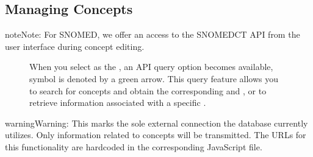\documentclass[a4paper,10pt,english]{sphinxmanual}
\begin{document}
\subsection{Managing Concepts}
\label{\detokenize{TechnicalDetails:managing-concepts}}
\begin{sphinxadmonition}{note}{Note:}
\sphinxAtStartPar
For SNOMED, we offer an access to the SNOMED\sphinxhyphen{}CT API from the user interface during concept editing.

\begin{figure}[H]
\centering
\capstart

\noindent{}
\caption{When you select  as the , an API query option becomes available, symbol is denoted by a green arrow. This query feature allows you to search for  concepts and obtain the corresponding  and , or to retrieve information associated with a specific .}\label{\detokenize{TechnicalDetails:id9}}\end{figure}

\begin{sphinxadmonition}{warning}{Warning:}
\sphinxAtStartPar
This marks the sole external connection the database currently utilizes. Only information related to concepts will be transmitted. The URLs for this functionality are hardcoded in the corresponding JavaScript file.

\begin{sphinxVerbatim}[commandchars=\\\{\}]
\end{sphinxVerbatim}
\end{sphinxadmonition}
\end{sphinxadmonition}
\end{document}
